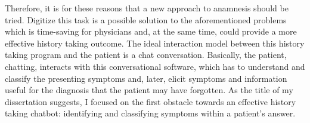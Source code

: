 Therefore, it is for these reasons that a new approach to anamnesis should be tried. Digitize this task is a possible solution to the aforementioned problems which is time-saving for physicians and, at the same time, could provide a more effective history taking outcome. The ideal interaction model between this history taking program and the patient is a chat conversation. Basically, the patient, chatting, interacts with this conversational software, which has to understand and classify the presenting symptoms and, later, elicit symptoms and information useful for the diagnosis that the patient may have forgotten. As the title of my dissertation suggests, I focused on the first obstacle towards an effective history taking chatbot: identifying and classifying symptoms within a patient’s answer.

\section{}
\label{sec:problem_doctors}

